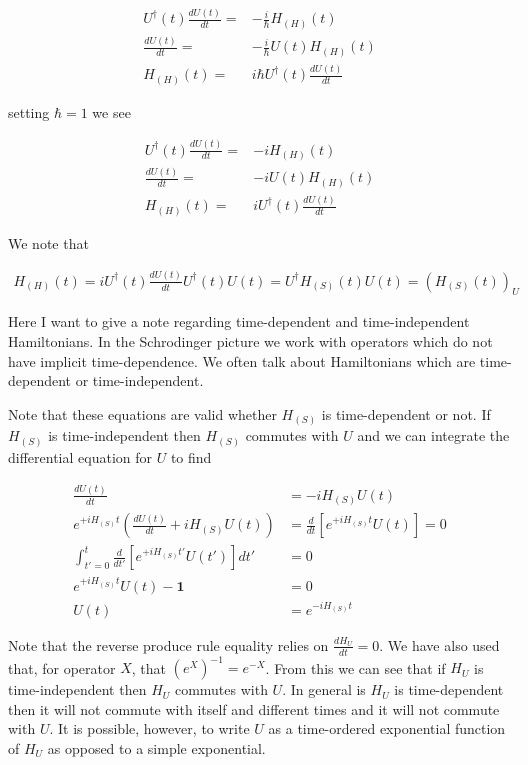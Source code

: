 \documentclass[12pt]{article}
\newcommand{\bv}[1]{\boldsymbol{#1}}
\begin{document}
\begin{align}
U^{\dag}(t)\frac{dU(t)}{dt} =& -\frac{i}{\hbar}H_{(H)}(t)\\
\frac{dU(t)}{dt} =& -\frac{i}{\hbar}U(t)H_{(H)}(t)\\
H_{(H)}(t) =& i\hbar U^{\dag}(t)\frac{dU(t)}{dt}
\end{align}

setting $\hbar=1$ we see

\begin{align}
U^{\dag}(t)\frac{dU(t)}{dt} =& -i H_{(H)}(t)\\
\frac{dU(t)}{dt} =& -i U(t)H_{(H)}(t)\\
H_{(H)}(t) =& i U^{\dag}(t)\frac{dU(t)}{dt}
\end{align}

We note that

\begin{align}
H_{(H)}(t) = iU^{\dag}(t)\frac{dU(t)}{dt} U^{\dag}(t)U(t) = U^{\dag}H_{(S)}(t)U(t) = \left(H_{(S)}(t)\right)_U
\end{align}


Here I want to give a note regarding time-dependent and time-independent Hamiltonians.
In the Schrodinger picture we work with operators which do not have implicit time-dependence.
We often talk about Hamiltonians which are time-dependent or time-independent.


Note that these equations are valid whether $H_{(S)}$ is time-dependent or not.
If $H_{(S)}$ is time-independent then $H_{(S)}$ commutes with $U$ and we can integrate the differential equation for $U$ to find

\begin{align}
\frac{dU(t)}{dt} &= -iH_{(S)} U(t)\\
e^{+iH_{(S)} t} \left(\frac{dU(t)}{dt} +iH_{(S)} U(t)\right) &= \frac{d}{dt}\left[e^{+iH_{(S)} t}U(t)\right] = 0\\
\int_{t'=0}^t \frac{d}{dt'}\left[e^{+iH_{(S)} t'}U(t')\right]  dt' &= 0\\
e^{+iH_{(S)} t}U(t) - \bv{1} &= 0\\
U(t) &= e^{-iH_{(S)} t}
\end{align}

Note that the reverse produce rule equality relies on $\frac{dH_U}{dt} =0$.
We have also used that, for operator $X$, that $\left(e^X\right)^{-1} = e^{-X}$.
From this we can see that if $H_U$ is time-independent then $H_U$ commutes with $U$.
In general is $H_U$ is time-dependent then it will not commute with itself and different times and it will not commute with $U$.
It is possible, however, to write $U$ as a time-ordered exponential function of $H_U$ as opposed to a simple exponential.
\end{document}

